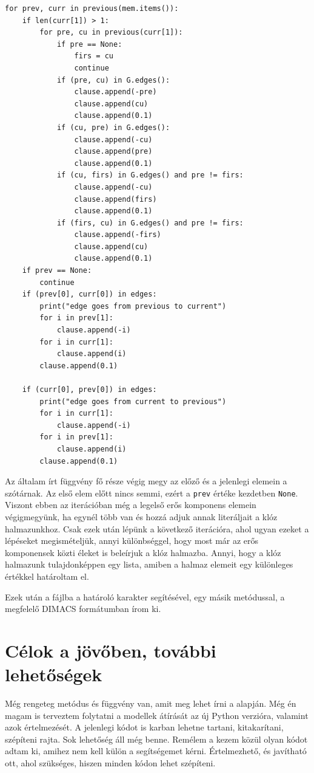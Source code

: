 \documentclass[
]{thesis-ekf}
\theoremstyle{definition}
\theoremstyle{remark}
\begin{document}
	\begin{lstlisting}
for prev, curr in previous(mem.items()):
	if len(curr[1]) > 1:
		for pre, cu in previous(curr[1]):
			if pre == None:
				firs = cu
				continue
			if (pre, cu) in G.edges():
				clause.append(-pre)
				clause.append(cu)
				clause.append(0.1)
			if (cu, pre) in G.edges():
				clause.append(-cu)
				clause.append(pre)
				clause.append(0.1)
			if (cu, firs) in G.edges() and pre != firs:
				clause.append(-cu)
				clause.append(firs)
				clause.append(0.1)
			if (firs, cu) in G.edges() and pre != firs:
				clause.append(-firs)
				clause.append(cu)
				clause.append(0.1)
	if prev == None:
		continue
	if (prev[0], curr[0]) in edges:
		print("edge goes from previous to current")
		for i in prev[1]:
			clause.append(-i)
		for i in curr[1]:
			clause.append(i)
		clause.append(0.1)
	
	if (curr[0], prev[0]) in edges:
		print("edge goes from current to previous")
		for i in curr[1]:
			clause.append(-i)
		for i in prev[1]:
			clause.append(i)
		clause.append(0.1)
	\end{lstlisting}	
	
	Az általam írt függvény fő része végig megy az előző és a jelenlegi elemein a szótárnak. Az első elem előtt nincs semmi, ezért a \texttt{prev} értéke kezdetben \texttt{None}. Viszont ebben az iterációban még a legelső erős komponens elemein végigmegyünk, ha egynél több van és hozzá adjuk annak literáljait a klóz halmazunkhoz. Csak ezek után lépünk a következő iterációra, ahol ugyan ezeket a lépéseket megismételjük, annyi különbséggel, hogy most már az erős komponensek közti éleket is beleírjuk a klóz halmazba. Annyi, hogy a klóz halmazunk tulajdonképpen egy lista, amiben a halmaz elemeit egy különleges értékkel határoltam el.
	
	Ezek után a fájlba a határoló karakter segítésével, egy másik metódussal, a megfelelő \textsc{DIMACS} formátumban írom ki.
	
	\section{Célok a jövőben, további lehetőségek}
	
	Még rengeteg metódus és függvény van, amit meg lehet írni a \cite{github-py08} alapján. Még én magam is terveztem folytatni a modellek átírását az új Python verzióra, valamint azok értelmezését. A jelenlegi kódot is karban lehetne tartani, kitakarítani, szépíteni rajta. Sok lehetőség áll még benne. Remélem a kezem közül olyan kódot adtam ki, amihez nem kell külön a segítségemet kérni. Értelmezhető, és javítható ott, ahol szükséges, hiszen minden kódon lehet szépíteni.
\end{document}
